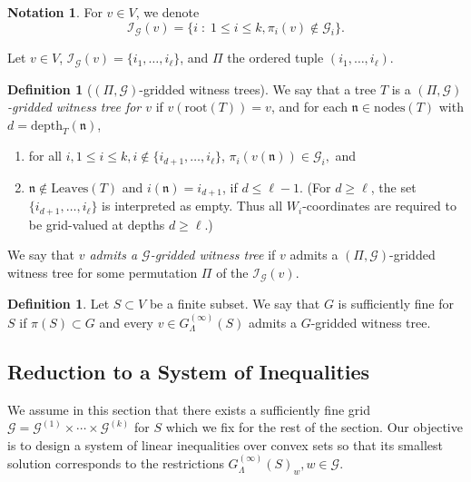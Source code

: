 \documentclass[10pt]{amsart}
\theoremstyle{plain}
\theoremstyle{definition}
\newtheorem{definition}[lemma]{Definition}
\newtheorem{notation}[lemma]{Notation}
\providecommand{\cG}[0]{\ensuremath{\mathcal G}\xspace}
\providecommand{\cI}[0]{\ensuremath{\mathcal I}\xspace}
\let\leq\leqslant
\begin{document}
\begin{notation}
For $v \in V$, we denote
\[
\cI_{\cG}(v) = \{i \;:\; 1 \leq i \leq k, \pi_i(v) \not\in \cG_i \}.
\]
\end{notation}

Let $v \in V$, $\cI_{\cG}(v) = \{i_1,\ldots,i_\ell\}$, and
$\Pi$ the ordered tuple  $(i_1,\ldots,i_\ell)$.

\begin{definition}[$(\Pi,\cG)$-gridded witness trees]
\label{def:gridded-witness-tree}
    We say that a tree $T$ is a
    \emph{$(\Pi,\cG)$-gridded witness tree for $v$}
    if $v(\mathrm{root}(T)) = v$, and 
    for each $\mathfrak{n} \in \mathrm{nodes}(T)$ with $d = \mathrm{depth}_T(\mathfrak{n})  
    $,
    \begin{enumerate}[1.]
    
        \item for 
        all $i, 1 \leq i \leq k, i \not\in \{i_{d+1},\ldots, i_\ell\}$,
        $
        \pi_{i}(v(\mathfrak{n})) \in \cG_{i},
        $ and
         \item $\mathfrak{n} \not\in \mathrm{Leaves}(T)$ and
    $i(\mathfrak{n}) = i_{d+1}$, if $d \leq \ell - 1$.
    (For \(d\ge \ell\), the set \(\{i_{d+1},\ldots,i_\ell\}\) is interpreted as empty.
Thus all \(W_i\)-coordinates are required to be grid-valued at depths \(d\ge \ell\).)
    \end{enumerate}
    
 We say that \emph{$v$ admits a $\cG$-gridded witness tree} if 
 $v$ admits a $(\Pi,\cG)$-gridded witness tree for some permutation
 $\Pi$ of the  $\cI_{\cG}(v)$.
\end{definition}

\begin{definition}
\label{def:fine-grid}
Let $S \subset V$ be a finite subset.
We say that \(G\) is sufficiently fine for \(S\) if
\(\pi(S)\subset G\) and every
\(v\in G_\Lambda^{(\infty)}(S)\) admits a
\(G\)-gridded witness tree.
\end{definition}






\subsection{Reduction to a System of Inequalities}
\label{subsec:reduction}


We assume in this section that there exists a sufficiently fine grid
$\cG = \cG^{(1)} \times \cdots \times \cG^{(k)}$ for $S$ which we fix for the rest of the section.
Our objective is to design a system of linear inequalities over convex sets so that its smallest solution corresponds to the restrictions 
$G^{(\infty)}_\Lambda(S)_w, w \in \mathcal{G}$.
\end{document}

